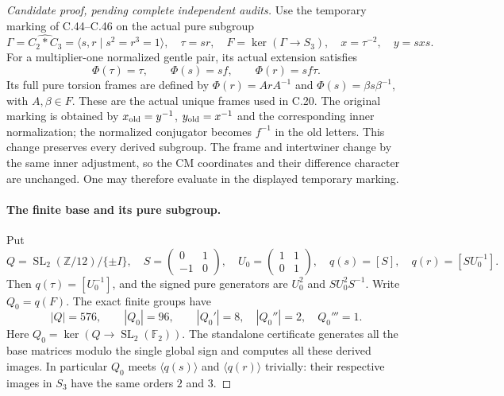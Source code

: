 \begin{proof}[Candidate proof, pending complete independent audits]
Use the temporary marking of C.44--C.46 on the actual pure subgroup
\[
 \Gamma=\widehat{C_2*C_3}=\langle s,r\mid s^2=r^3=1\rangle,
 \quad \tau=sr,\quad F=\ker(\Gamma\to S_3),\quad
 x=\tau^{-2},\quad y=sxs.
\]
For a multiplier-one normalized gentle pair, its actual extension
satisfies
\[
          \Phi(\tau)=\tau,\qquad \Phi(s)=sf,
          \qquad \Phi(r)=sf\tau.                     \tag{C.47.2}
\]
Its full pure torsion frames are defined by
$\Phi(r)=ArA^{-1}$ and $\Phi(s)=\beta s\beta^{-1}$,
with $A,\beta\in F$. These are the actual unique frames used in
C.20. The original marking is obtained by
$x_{\rm old}=y^{-1}$, $y_{\rm old}=x^{-1}$ and the corresponding
inner normalization; the normalized conjugator becomes $f^{-1}$
in the old letters. This change preserves every derived subgroup.
The frame and intertwiner change by the same inner adjustment,
so the CM coordinates and their difference character are unchanged.
One may therefore evaluate in the displayed temporary marking.

\paragraph{The finite base and its pure subgroup.}
Put
\[
 Q=\operatorname{SL}_2(\mathbb Z/12)/\{\pm I\},\quad
 S=\begin{pmatrix}0&1\\-1&0\end{pmatrix},\quad
 U_0=\begin{pmatrix}1&1\\0&1\end{pmatrix},\quad
 q(s)=[S],\quad q(r)=[SU_0^{-1}].                    \tag{C.47.3}
\]
Then $q(\tau)=[U_0^{-1}]$, and the signed pure generators are
$U_0^2$ and $SU_0^2S^{-1}$. Write $Q_0=q(F)$.
The exact finite groups have
\[
 |Q|=576,\qquad |Q_0|=96,\qquad
 |Q_0'|=8,\quad |Q_0''|=2,\quad Q_0'''=1.            \tag{C.47.4}
\]
Here $Q_0=\ker(Q\to\operatorname{SL}_2(\mathbb F_2))$.
The standalone certificate generates all the base matrices modulo
the single global sign and computes all these derived images.
In particular $Q_0$ meets $\langle q(s)\rangle$ and
$\langle q(r)\rangle$ trivially: their respective images in
$S_3$ have the same orders $2$ and $3$.


\end{proof}
